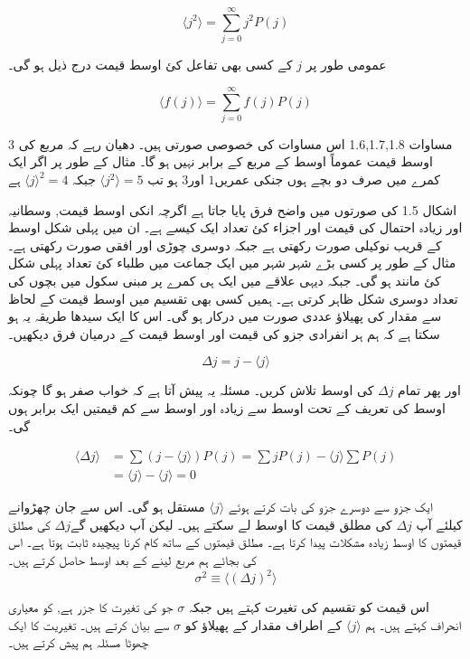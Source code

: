 \[ \langle j^{2} \rangle  = \sum_{j=0}^{\infty} j^{2} P(j) \] 

عمومی طور پر \( j \) کے کسی بھی تفاعل کئ اوسط قیمت درج ذیل ہو گی۔ 

\[ \langle f(j) \rangle = \sum_{j=0}^{\infty} f(j) P(j) \]

\( 3 \)
مساوات 1.6,1.7,1.8 اس مساوات کی خصوصی صورتی ہیں۔ دھیان رہے کہ مربع کی اوسط قیمت عموماً اوسط کے مربع کے برابر نہیں ہو گا۔ مثال کے طور پر اگر ایک کمرے میں صرف دو بچے ہوں جنکی عمریں\( 1 \) اور\( 3 \) ہو تب 
\( \langle j^{2} \rangle = 5 \)  جبکہ
\( \langle j\rangle ^{2} = 4 \)  ہے 


اشکال 1.5 کی صورتوں میں واضح فرق پایا جاتا ہے اگرچہ انکی اوسط قیمت, وسطانیہ اور زیادہ احتمال کی قیمت اور اجزاء کئ تعداد ایک کیسے ہے۔ ان میں پہلی شکل اوسط کے قریب نوکیلی صورت رکھتی ہے جبکہ دوسری چوڑی اور افقی صورت رکھتی ہے۔ مثال کے طور پر کسی بڑے شہر شہر میں ایک جماعت میں طلباء کئ تعداد پہلی شکل کئ مانند ہو گی۔ جبکہ دیہی علاقے میں ایک ہی کمرے پر مبنی سکول میں بچوں کی تعداد دوسری شکل ظاہر کرتی ہے۔ ہمیں کسی بھی تقسیم میں اوسط قیمت کے لحاظ سے مقدار کی پھیلاؤ عددی صورت میں درکار ہو گی۔ اس کا ایک سیدھا طریقہ یہ ہو سکتا ہے کہ ہم ہر انفرادی جزو کی قیمت اور اوسط قیمت کے درمیان فرق دیکھیں۔ 

\[ \Delta j = j-\langle j \rangle \]

اور پھر تمام \( \Delta j \) کی اوسط تلاش کریں۔ مسئلہ یہ پیش آتا ہے کہ خواب صفر ہو گا چونکہ اوسط کی تعریف کے تحت اوسط سے زیادہ اور اوسط سے کم قیمتیں ایک برابر ہوں گی۔ 

\begin{align*}
\langle \Delta j \rangle &= \sum \left( j -  \langle j \rangle  \right) P(j) = \sum jP(j) - \langle j \rangle \sum P(j) \\
 &= \langle j \rangle - \langle j \rangle = 0
\end{align*}

ایک جزو سے دوسرے جزو کی بات کرتے ہوئے \( \langle j \rangle \)   مستقل ہو گی۔ اس سے جان چھڑوانے کیلئے آپ  \( \Delta j \)   
 کی مطلق قیمت کا اوسط لے سکتے ہیں۔ لیکن آپ دیکھیں گے\( \Delta j \)    کی مطلق قیمتوں کا اوسط زیادہ مشکلات پیدا کرتا ہے۔ مطلق قیمتوں کے ساتھ کام کرنا پیچیدہ ثابت ہوتا ہے۔ اس کی بجائے ہم مربع لینے کے بعد اوسط حاصل کرتے ہیں۔ 
\[ \sigma^{2} \equiv \langle \left( \Delta j \right)^{2} \rangle \]


اس قیمت کو تقسیم کی تغیرت کہتے ہیں جبکہ \( \sigma \) جو کی تغیرت کا جزر ہے, کو معیاری انحراف کہتے ہیں۔ ہم \( \langle j \rangle \)  کے اطراف مقدار کے پھیلاؤ کو \( \sigma \)  سے بیان کرتے ہیں۔ تغیریت کا ایک چھوٹا مسئلہ ہم پیش کرتے ہیں۔ 

